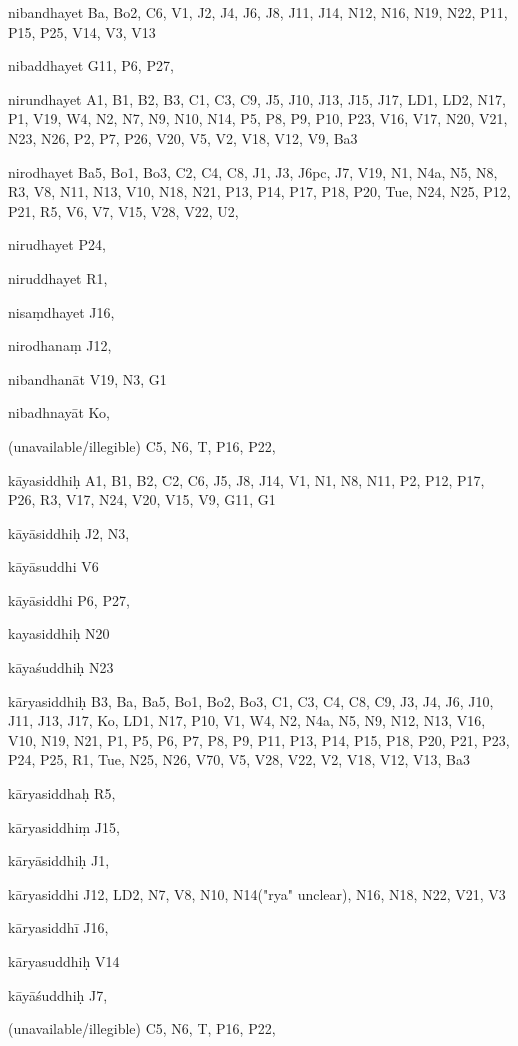  \begin{marma}[hp02_003]
\item[nibandhayet] Ba, Bo2, C6, V1, J2, J4, J6, J8, J11, J14, N12, N16, N19, N22, P11, P15, P25, V14, V3, V13
\item[nibaddhayet] G11, P6, P27,
\item[nirundhayet] A1, B1, B2, B3, C1, C3, C9, J5, J10, J13, J15, J17, LD1, LD2, N17, P1, V19, W4, N2, N7, N9, N10, N14, P5, P8, P9, P10, P23, V16, V17, N20, V21, N23, N26, P2, P7, P26, V20, V5, V2, V18, V12, V9, Ba3
\item[nirodhayet] Ba5, Bo1, Bo3, C2, C4, C8, J1, J3, J6pc, J7, V19, N1, N4a, N5, N8, R3, V8, N11, N13, V10, N18, N21, P13, P14, P17, P18, P20, Tue, N24, N25, P12, P21, R5, V6, V7, V15, V28, V22, U2,
\item[nirudhayet] P24,
\item[niruddhayet] R1, 
\item[nisaṃdhayet] J16,
\item[nirodhanaṃ] J12,
\item[nibandhanāt] V19, N3, G1
\item[nibadhnayāt] Ko,
\item[(unavailable/illegible)] C5, N6, T, P16, P22,
  \begin{description}

    \end{description}
 \end{marma}



 \begin{marma}[hp02_004]
\item[kāyasiddhiḥ] A1, B1, B2, C2, C6, J5, J8, J14, V1, N1, N8, N11, P2, P12, P17, P26, R3, V17, N24, V20, V15, V9, G11, G1
\item[kāyāsiddhiḥ] J2, N3,
\item[kāyāsuddhi] V6
\item[kāyāsiddhi] P6, P27, 
\item[kayasiddhiḥ] N20
\item[kāyaśuddhiḥ] N23
\item[kāryasiddhiḥ] B3, Ba, Ba5, Bo1, Bo2, Bo3, C1, C3, C4, C8, C9, J3, J4, J6, J10, J11, J13, J17, Ko, LD1, N17, P10, V1, W4, N2, N4a, N5, N9, N12, N13, V16, V10, N19, N21, P1, P5, P6, P7, P8, P9, P11, P13, P14, P15, P18, P20, P21, P23, P24, P25, R1, Tue, N25, N26, V70, V5, V28, V22, V2, V18, V12, V13, Ba3
\item[kāryasiddhaḥ] R5,
\item[kāryasiddhiṃ] J15, 
\item[kāryāsiddhiḥ] J1,
\item[kāryasiddhi] J12, LD2, N7, V8, N10, N14("rya" unclear), N16, N18, N22, V21, V3 
\item[kāryasiddhī] J16,
\item[kāryasuddhiḥ] V14
\item[kāyāśuddhiḥ] J7,
\item[(unavailable/illegible)] C5, N6, T, P16, P22,

  \begin{description}

    \end{description}
 \end{marma}


